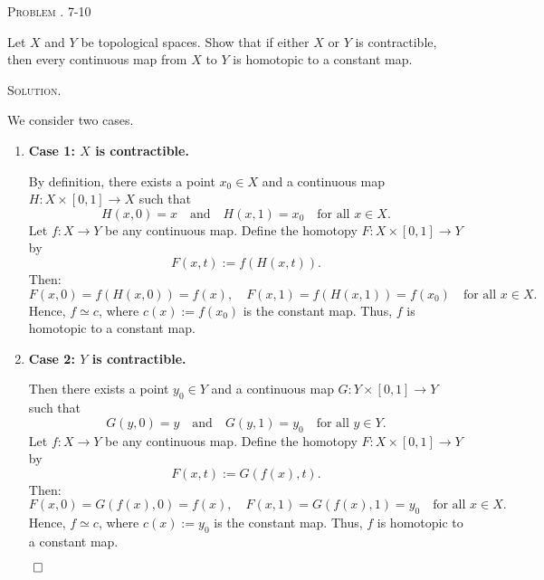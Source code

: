 \documentclass[12pt, a4paper, oneside]{ctexart}
\newcounter{problemname}
\newenvironment{problem}{\begin{framed}\stepcounter{problemname}\par\noindent\textsc{Problem \arabic{problemname}. }}{\end{framed}\par}
\newenvironment{solution}{%
	\par\noindent\textsc{Solution. }\ignorespaces
}{%
	\hfill$\qed$\par
}
\begin{document}
	\begin{problem}
	7-10
	
	Let \( X \) and \( Y \) be topological spaces. Show that if either \( X \) or \( Y \) is contractible, then every continuous map from \( X \) to \( Y \) is homotopic to a constant map.
	
		
		
	\end{problem}
	
	\begin{solution}
		We consider two cases.
		
		\begin{enumerate}[(1)]
			\item \textbf{Case 1: \( X \) is contractible.}
			
			By definition, there exists a point \( x_0 \in X \) and a continuous map \( H: X \times [0,1] \to X \) such that
			\[
			H(x,0) = x \quad \text{and} \quad H(x,1) = x_0 \quad \text{for all } x \in X.
			\]
			Let \( f: X \to Y \) be any continuous map. Define the homotopy \( F: X \times [0,1] \to Y \) by
			\[
			F(x,t) := f(H(x,t)).
			\]
			Then:
			\[
			F(x,0) = f(H(x,0)) = f(x), \quad F(x,1) = f(H(x,1)) = f(x_0) \quad \text{for all } x \in X.
			\]
			Hence, \( f \simeq c \), where \( c(x) := f(x_0) \) is the constant map. Thus, \( f \) is homotopic to a constant map.
			\item \textbf{Case 2: \( Y \) is contractible.}
			
			Then there exists a point \( y_0 \in Y \) and a continuous map \( G: Y \times [0,1] \to Y \) such that
			\[
			G(y,0) = y \quad \text{and} \quad G(y,1) = y_0 \quad \text{for all } y \in Y.
			\]
			Let \( f: X \to Y \) be any continuous map. Define the homotopy \( F: X \times [0,1] \to Y \) by
			\[
			F(x,t) := G(f(x),t).
			\]
			Then:
			\[
			F(x,0) = G(f(x),0) = f(x), \quad F(x,1) = G(f(x),1) = y_0 \quad \text{for all } x \in X.
			\]
			Hence, \( f \simeq c \), where \( c(x) := y_0 \) is the constant map. Thus, \( f \) is homotopic to a constant map.
		\end{enumerate}
		
	\end{solution}
	
\end{document}

